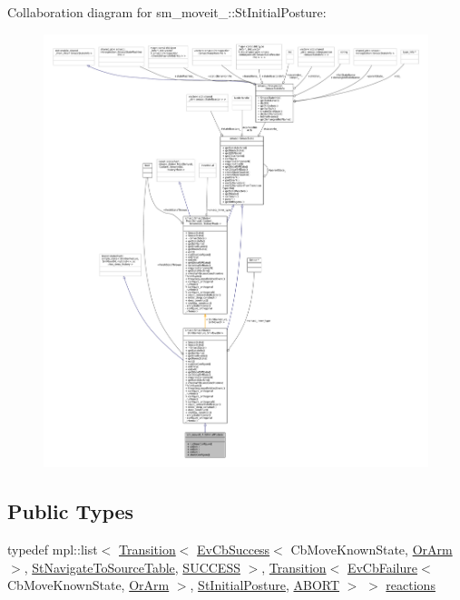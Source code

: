 Collaboration diagram for sm\+\_\+moveit\+\_\+:\+:St\+Initial\+Posture\+:
\nopagebreak
\begin{figure}[H]
\begin{center}
\leavevmode
\includegraphics[width=350pt]{structsm__moveit__4_1_1StInitialPosture__coll__graph}
\end{center}
\end{figure}
\subsection*{Public Types}
\begin{DoxyCompactItemize}
\item 
typedef mpl\+::list$<$ \hyperlink{classsmacc_1_1Transition}{Transition}$<$ \hyperlink{structsmacc_1_1EvCbSuccess}{Ev\+Cb\+Success}$<$ Cb\+Move\+Known\+State, \hyperlink{classsm__moveit__4_1_1OrArm}{Or\+Arm} $>$, \hyperlink{structsm__moveit__4_1_1StNavigateToSourceTable}{St\+Navigate\+To\+Source\+Table}, \hyperlink{structsmacc_1_1default__transition__tags_1_1SUCCESS}{S\+U\+C\+C\+E\+SS} $>$, \hyperlink{classsmacc_1_1Transition}{Transition}$<$ \hyperlink{structsmacc_1_1EvCbFailure}{Ev\+Cb\+Failure}$<$ Cb\+Move\+Known\+State, \hyperlink{classsm__moveit__4_1_1OrArm}{Or\+Arm} $>$, \hyperlink{structsm__moveit__4_1_1StInitialPosture}{St\+Initial\+Posture}, \hyperlink{structsmacc_1_1default__transition__tags_1_1ABORT}{A\+B\+O\+RT} $>$ $>$ \hyperlink{structsm__moveit__4_1_1StInitialPosture_a148911f1eb562fd614640abc29ba1d07}{reactions}
\end{DoxyCompactItemize}
